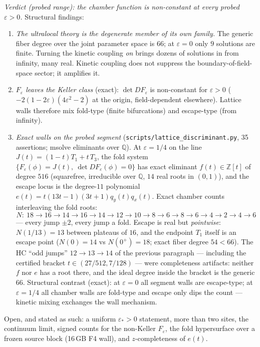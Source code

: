 \documentclass[11pt]{article}
\theoremstyle{definition}
\theoremstyle{remark}
\newcommand{\Q}{\mathbb{Q}}
\newcommand{\Z}{\mathbb{Z}}
\begin{document}
\emph{Verdict (probed range): the chamber function is non-constant at
every probed $\varepsilon>0$.} Structural findings:

\begin{enumerate}
\item \emph{The ultralocal theory is the degenerate member of its own
 family.} The generic fiber degree over the joint parameter space is
 $66$; at $\varepsilon=0$ only $9$ solutions are finite. Turning the
 kinetic coupling \emph{on} brings dozens of solutions in from
 infinity, many real. Kinetic coupling does not suppress the
 boundary-of-field-space sector; it amplifies it.
\item \emph{$F_\varepsilon$ leaves the Keller class} (exact):
 $\det DF_\varepsilon$ is non-constant for $\varepsilon>0$
 ($-2(1-2\varepsilon)(4\varepsilon^2-2)$ at the origin,
 field-dependent elsewhere). Lattice walls therefore mix fold-type
 (finite bifurcations) and escape-type (from infinity).
\item \emph{Exact walls on the probed segment}
 (\texttt{scripts/lattice\_discriminant.py}, 35 assertions; msolve
 eliminants over $\Q$). At $\varepsilon=1/4$ on the line
 $J(t)=(1-t)T_1+t\,T_3$, the fold system
 $\{F_\varepsilon(\phi)=J(t),\ \det DF_\varepsilon(\phi)=0\}$ has
 exact eliminant $f(t)\in\Z[t]$ of degree $516$ (squarefree,
 irreducible over $\Q$, $14$ real roots in $(0,1)$), and the escape
 locus is the degree-$11$ polynomial
 $e(t)=t(13t-1)(3t+1)q_y(t)q_x(t)$. Exact chamber counts
 interleaving the fold roots:
 \[
 N:\ 18\to16\to14\to16\to14\to12\to10\to8\to6\to8\to6\to4\to2\to4\to6
 \]
 --- every jump $\pm2$, every jump a fold. Escape is real but
 \emph{pointwise}: $N(1/13)=13$ between plateaus of $16$, and the
 endpoint $T_1$ itself is an escape point ($N(0)=14$ vs $N(0^+)=18$;
 exact fiber degree $54<66$). The HC ``odd jumps'' $12\to13\to14$ of
 the previous paragraph --- including the certified bracket
 $t\in(27/512,7/128)$ --- were completeness artifacts: neither $f$
 nor $e$ has a root there, and the ideal degree inside the bracket is
 the generic $66$. Structural contrast (exact): at $\varepsilon=0$ all
 segment walls are escape-type; at $\varepsilon=1/4$ all chamber walls
 are fold-type and escape only dips the count --- kinetic mixing
 exchanges the wall mechanism.
\end{enumerate}

Open, and stated as such: a uniform $\varepsilon_*>0$ statement, more
than two sites, the continuum limit, signed counts for the
non-Keller $F_\varepsilon$, the fold hypersurface over a frozen source
block (16\,GB F4 wall), and $z$-completeness of $e(t)$.
\end{document}
